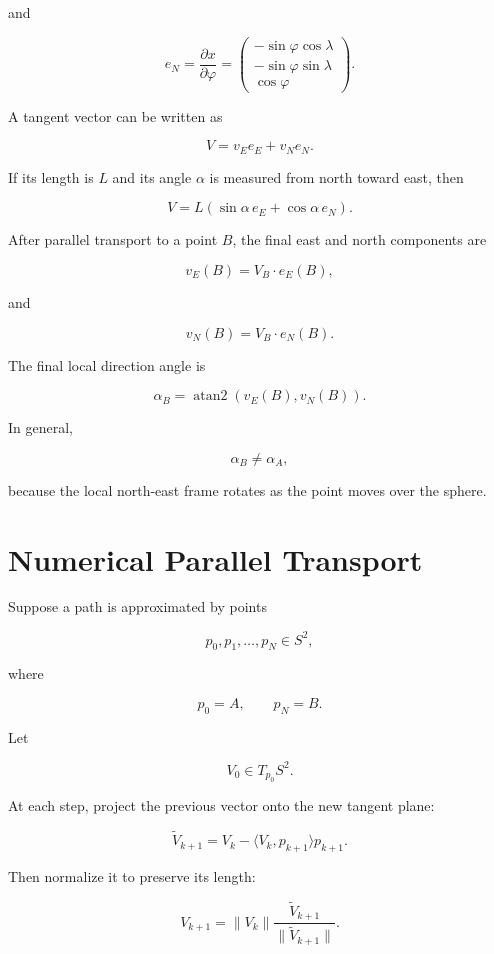 \documentclass[12pt,a4paper]{article}
\theoremstyle{notespace}
\begin{document}
and

\[
\boxed{
	e_N
	=
	\frac{\partial x}{\partial\varphi}
	=
	\begin{pmatrix}
		-\sin\varphi\cos\lambda\\
		-\sin\varphi\sin\lambda\\
		\cos\varphi
	\end{pmatrix}.
}
\]

A tangent vector can be written as

\[
V=v_Ee_E+v_Ne_N.
\]

If its length is \(L\) and its angle \(\alpha\) is measured from north
toward east, then

\[
\boxed{
	V
	=
	L\left(
	\sin\alpha\,e_E
	+
	\cos\alpha\,e_N
	\right).
}
\]

After parallel transport to a point \(B\), the final east and north
components are

\[
v_E(B)=V_B\cdot e_E(B),
\]

and

\[
v_N(B)=V_B\cdot e_N(B).
\]

The final local direction angle is

\[
\boxed{
	\alpha_B
	=
	\operatorname{atan2}
	\left(
	v_E(B),
	v_N(B)
	\right).
}
\]

In general,

\[
\alpha_B\neq\alpha_A,
\]

because the local north-east frame rotates as the point moves over the
sphere.

\section{Numerical Parallel Transport}

Suppose a path is approximated by points

\[
p_0,p_1,\ldots,p_N\in S^2,
\]

where

\[
p_0=A,
\qquad
p_N=B.
\]

Let

\[
V_0\in T_{p_0}S^2.
\]

At each step, project the previous vector onto the new tangent plane:

\[
\widetilde V_{k+1}
=
V_k
-
\langle V_k,p_{k+1}\rangle p_{k+1}.
\]

Then normalize it to preserve its length:

\[
\boxed{
	V_{k+1}
	=
	\|V_k\|
	\frac{\widetilde V_{k+1}}
	{\|\widetilde V_{k+1}\|}.
}
\]
\end{document}
